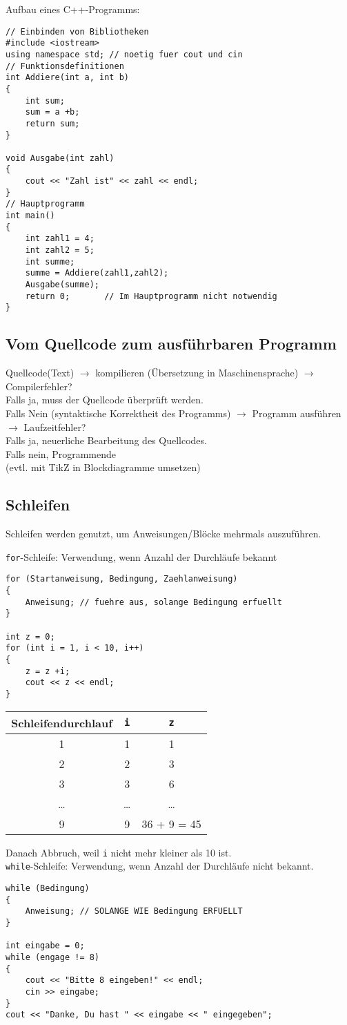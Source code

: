Aufbau eines C++-Programms:
\begin{lstlisting}
// Einbinden von Bibliotheken
#include <iostream>
using namespace std; // noetig fuer cout und cin
// Funktionsdefinitionen
int Addiere(int a, int b)
{
	int sum;
	sum = a +b;
	return sum;
}

void Ausgabe(int zahl)
{
	cout << "Zahl ist" << zahl << endl;
}
// Hauptprogramm
int main()
{
	int zahl1 = 4;
	int zahl2 = 5;
	int summe;
	summe = Addiere(zahl1,zahl2);
	Ausgabe(summe);
	return 0; 		// Im Hauptprogramm nicht notwendig
}
\end{lstlisting}
\subsection{Vom Quellcode zum ausführbaren Programm}
Quellcode(Text) $\rightarrow$ kompilieren (Übersetzung in Maschinensprache) $\rightarrow$ Compilerfehler? \\
Falls ja, muss der Quellcode überprüft werden. \\
Falls Nein (syntaktische Korrektheit des Programms) $\rightarrow$ Programm ausführen $\rightarrow$ Laufzeitfehler? \\
Falls ja, neuerliche Bearbeitung des Quellcodes. \\
Falls nein, Programmende \\
(evtl. mit TikZ in Blockdiagramme umsetzen)

\subsection{Schleifen}
Schleifen werden genutzt, um Anweisungen/Blöcke mehrmals auszuführen.


\texttt{for}-Schleife: Verwendung, wenn Anzahl der Durchläufe bekannt
\begin{lstlisting}
for (Startanweisung, Bedingung, Zaehlanweisung)
{
	Anweisung; // fuehre aus, solange Bedingung erfuellt
}

int z = 0;
for (int i = 1, i < 10, i++)
{
	z = z +i;
	cout << z << endl;
}
\end{lstlisting}
\begin{table}[h]
\begin{tabular}{c|c|c}
Schleifendurchlauf & \texttt{i} & \texttt{z}\\
\hline
1 & 1 & 1 \\
2 & 2 & 3 \\
3 & 3 & 6 \\
\dots & \dots & \dots \\
9 & 9 & 36 + 9 = 45 \\
\end{tabular}
\end{table}
Danach Abbruch, weil \texttt{i} nicht mehr kleiner als 10 ist. \\

\texttt{while}-Schleife: Verwendung, wenn Anzahl der Durchläufe nicht bekannt.
\begin{lstlisting}
while (Bedingung)
{
	Anweisung; // SOLANGE WIE Bedingung ERFUELLT
}

int eingabe = 0;
while (engage != 8)
{
	cout << "Bitte 8 eingeben!" << endl;
	cin >> eingabe;
}
cout << "Danke, Du hast " << eingabe << " eingegeben";
\end{lstlisting}
